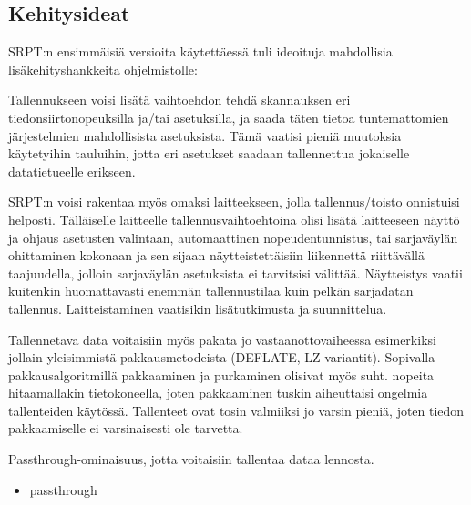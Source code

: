 \subsection{Kehitysideat}

SRPT:n ensimmäisiä versioita käytettäessä tuli ideoituja mahdollisia lisäkehityshankkeita ohjelmistolle:

Tallennukseen voisi lisätä vaihtoehdon tehdä skannauksen eri tiedonsiirtonopeuksilla ja/tai asetuksilla, ja saada täten tietoa tuntemattomien järjestelmien mahdollisista asetuksista. Tämä vaatisi pieniä muutoksia käytetyihin tauluihin, jotta eri asetukset saadaan tallennettua jokaiselle datatietueelle erikseen.

SRPT:n voisi rakentaa myös omaksi laitteekseen, jolla tallennus/toisto onnistuisi helposti. Tälläiselle laitteelle tallennusvaihtoehtoina olisi lisätä laitteeseen näyttö ja ohjaus asetusten valintaan, automaattinen nopeudentunnistus, tai sarjaväylän ohittaminen kokonaan ja sen sijaan näytteistettäisiin liikennettä riittävällä taajuudella, jolloin sarjaväylän asetuksista ei tarvitsisi välittää. Näytteistys vaatii kuitenkin huomattavasti enemmän tallennustilaa kuin pelkän sarjadatan tallennus. Laitteistaminen vaatisikin lisätutkimusta ja suunnittelua.

Tallennetava data voitaisiin myös pakata jo vastaanottovaiheessa esimerkiksi jollain yleisimmistä pakkausmetodeista (DEFLATE, LZ-variantit). Sopivalla pakkausalgoritmillä pakkaaminen ja purkaminen olisivat myös suht. nopeita hitaamallakin tietokoneella, joten pakkaaminen tuskin aiheuttaisi ongelmia tallenteiden käytössä. Tallenteet ovat tosin valmiiksi jo varsin pieniä, joten tiedon pakkaamiselle ei varsinaisesti ole tarvetta.

Passthrough-ominaisuus, jotta voitaisiin tallentaa dataa lennosta.

\begin{itemize}
\item passthrough
\end{itemize}




